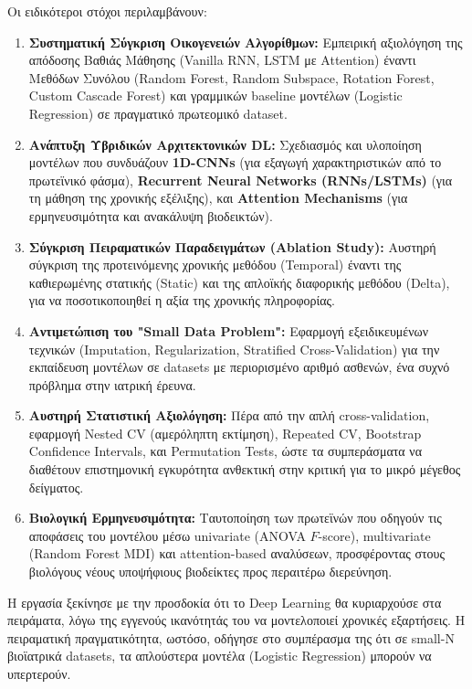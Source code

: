 Οι ειδικότεροι στόχοι περιλαμβάνουν:

\begin{enumerate}
\item \textbf{Συστηματική Σύγκριση Οικογενειών Αλγορίθμων:} Εμπειρική αξιολόγηση της απόδοσης Βαθιάς Μάθησης (Vanilla RNN, LSTM με Attention) έναντι Μεθόδων Συνόλου (Random Forest, Random Subspace, Rotation Forest, Custom Cascade Forest) και γραμμικών baseline μοντέλων (Logistic Regression) σε πραγματικό πρωτεομικό dataset.
\item \textbf{Ανάπτυξη Υβριδικών Αρχιτεκτονικών DL:} Σχεδιασμός και υλοποίηση μοντέλων που συνδυάζουν \textbf{1D-CNNs} (για εξαγωγή χαρακτηριστικών από το πρωτεϊνικό φάσμα), \textbf{Recurrent Neural Networks (RNNs/LSTMs)} (για τη μάθηση της χρονικής εξέλιξης), και \textbf{Attention Mechanisms} (για ερμηνευσιμότητα και ανακάλυψη βιοδεικτών).
\item \textbf{Σύγκριση Πειραματικών Παραδειγμάτων (Ablation Study):} Αυστηρή σύγκριση της προτεινόμενης χρονικής μεθόδου (Temporal) έναντι της καθιερωμένης στατικής (Static) και της απλοϊκής διαφορικής μεθόδου (Delta), για να ποσοτικοποιηθεί η αξία της χρονικής πληροφορίας.
\item \textbf{Αντιμετώπιση του "Small Data Problem":} Εφαρμογή εξειδικευμένων τεχνικών (Imputation, Regularization, Stratified Cross-Validation) για την εκπαίδευση μοντέλων σε datasets με περιορισμένο αριθμό ασθενών, ένα συχνό πρόβλημα στην ιατρική έρευνα.
\item \textbf{Αυστηρή Στατιστική Αξιολόγηση:} Πέρα από την απλή cross-validation, εφαρμογή Nested CV (αμερόληπτη εκτίμηση), Repeated CV, Bootstrap Confidence Intervals, και Permutation Tests, ώστε τα συμπεράσματα να διαθέτουν επιστημονική εγκυρότητα ανθεκτική στην κριτική για το μικρό μέγεθος δείγματος.
\item \textbf{Βιολογική Ερμηνευσιμότητα:} Ταυτοποίηση των πρωτεϊνών που οδηγούν τις αποφάσεις του μοντέλου μέσω univariate (ANOVA $F$-score), multivariate (Random Forest MDI) και attention-based αναλύσεων, προσφέροντας στους βιολόγους νέους υποψήφιους βιοδείκτες προς περαιτέρω διερεύνηση.
\end{enumerate}

Η εργασία ξεκίνησε με την προσδοκία ότι το Deep Learning θα κυριαρχούσε στα πειράματα, λόγω της εγγενούς ικανότητάς του να μοντελοποιεί χρονικές εξαρτήσεις. Η πειραματική πραγματικότητα, ωστόσο, οδήγησε στο συμπέρασμα της ότι σε small-N βιοϊατρικά datasets, τα απλούστερα μοντέλα (Logistic Regression) μπορούν να υπερτερούν.

